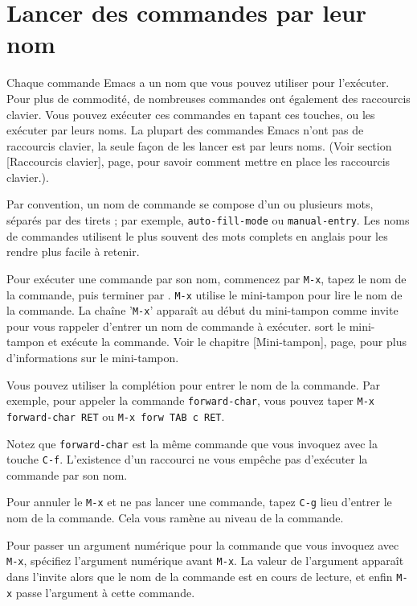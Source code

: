 \chapter{Lancer des commandes par leur nom}


Chaque commande Emacs a un nom que vous pouvez utiliser pour
l'exécuter. Pour plus de commodité, de nombreuses commandes ont
également des raccourcis clavier. Vous pouvez exécuter ces commandes
en tapant ces touches, ou les exécuter par leurs noms. La plupart des
commandes Emacs n'ont pas de raccourcis clavier, la seule façon de les
lancer est par leurs noms. (Voir section [Raccourcis
clavier], page, pour savoir comment mettre en place les
raccourcis clavier.).

Par convention, un nom de commande se compose d'un ou plusieurs mots,
séparés par des tirets ; par exemple, \texttt{auto-fill-mode} ou
\texttt{manual-entry}. Les noms de commandes utilisent le plus souvent
des mots complets en anglais pour les rendre plus facile à retenir.

Pour exécuter une commande par son nom, commencez par \texttt{M-x},
tapez le nom de la commande, puis terminer par \RET. \texttt{M-x}
utilise le mini-tampon pour lire le nom de la commande. La chaîne
'\texttt{M-x}' apparaît au début du mini-tampon comme invite pour vous
rappeler d'entrer un nom de commande à exécuter. \RET sort le
mini-tampon et exécute la commande. Voir le chapitre
[Mini-tampon], page, pour plus d'informations sur le
mini-tampon.

Vous pouvez utiliser la complétion pour entrer le nom de la
commande. Par exemple, pour appeler la commande \texttt{forward-char},
vous pouvez taper \texttt{M-x forward-char RET} ou \texttt{M-x forw
  TAB c RET}.

Notez que \texttt{forward-char} est la même commande que vous invoquez
avec la touche \texttt{C-f}. L'existence d'un raccourci ne vous
empêche pas d'exécuter la commande par son nom. 

Pour annuler le \texttt{M-x} et ne pas lancer une commande, tapez
\texttt{C-g} lieu d'entrer le nom de la commande. Cela vous ramène au
niveau de la commande.

Pour passer un argument numérique pour la commande que vous invoquez
avec \texttt{M-x}, spécifiez l'argument numérique avant
\texttt{M-x}. La valeur de l'argument apparaît dans l'invite alors que
le nom de la commande est en cours de lecture, et enfin \texttt{M-x}
passe l'argument à cette commande. 

